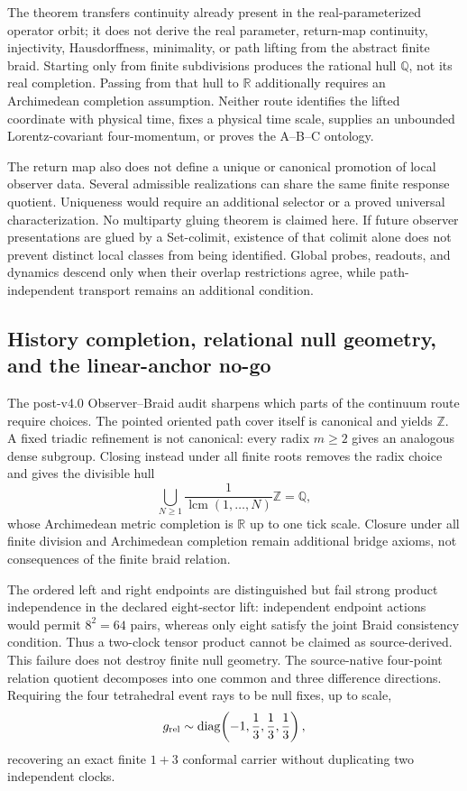 \documentclass[11pt]{article}
\theoremstyle{definition}
\theoremstyle{remark}
\begin{document}
The theorem transfers continuity already present in the real-parameterized operator orbit; it does not derive the real parameter, return-map continuity, injectivity, Hausdorffness, minimality, or path lifting from the abstract finite braid. Starting only from finite subdivisions produces the rational hull $\mathbb Q$, not its real completion. Passing from that hull to $\mathbb R$ additionally requires an Archimedean completion assumption. Neither route identifies the lifted coordinate with physical time, fixes a physical time scale, supplies an unbounded Lorentz-covariant four-momentum, or proves the A--B--C ontology.

The return map also does not define a unique or canonical promotion of local observer data. Several admissible realizations can share the same finite response quotient. Uniqueness would require an additional selector or a proved universal characterization. No multiparty gluing theorem is claimed here. If future observer presentations are glued by a Set-colimit, existence of that colimit alone does not prevent distinct local classes from being identified. Global probes, readouts, and dynamics descend only when their overlap restrictions agree, while path-independent transport remains an additional condition.

\subsection{History completion, relational null geometry, and the linear-anchor no-go}

The post-v4.0 Observer--Braid audit sharpens which parts of the continuum route require choices. The pointed oriented path cover itself is canonical and yields $\mathbb Z$. A fixed triadic refinement is not canonical: every radix $m\ge2$ gives an analogous dense subgroup. Closing instead under all finite roots removes the radix choice and gives the divisible hull
\begin{equation}
 \bigcup_{N\ge1}\frac{1}{\operatorname{lcm}(1,\ldots,N)}\mathbb Z
 =\mathbb Q,
\end{equation}
whose Archimedean metric completion is $\mathbb R$ up to one tick scale. Closure under all finite division and Archimedean completion remain additional bridge axioms, not consequences of the finite braid relation.

The ordered left and right endpoints are distinguished but fail strong product independence in the declared eight-sector lift: independent endpoint actions would permit $8^2=64$ pairs, whereas only eight satisfy the joint Braid consistency condition. Thus a two-clock tensor product cannot be claimed as source-derived. This failure does not destroy finite null geometry. The source-native four-point relation quotient decomposes into one common and three difference directions. Requiring the four tetrahedral event rays to be null fixes, up to scale,
\begin{equation}
 g_{\rm rel}\sim\operatorname{diag}\!\left(-1,\frac13,\frac13,\frac13\right),
\end{equation}
recovering an exact finite $1+3$ conformal carrier without duplicating two independent clocks.
\end{document}

